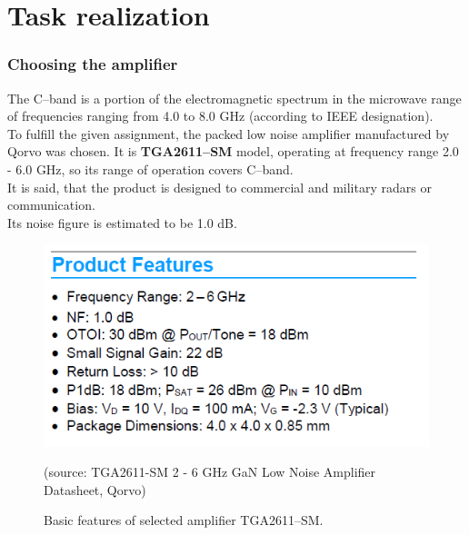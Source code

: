 \documentclass[eng,printmode]{mgr}
\begin{document}
\section{Task realization}
\subsubsection{Choosing the amplifier}
The C--band is a portion of the electromagnetic spectrum in the microwave range of frequencies ranging from 4.0 to 8.0 GHz (according to IEEE designation).\\
To fulfill the given assignment, the packed low noise amplifier manufactured by Qorvo was chosen. It is \textbf{TGA2611--SM} model, operating at frequency range 2.0 - 6.0 GHz, so its range of operation covers C--band.
\\
It is said, that the product is designed to commercial and military radars or communication.\\
Its noise figure is estimated to be 1.0 dB.

\begin{figure}[h]
	\centering
	\includegraphics[width=0.5\linewidth]{chip}
	\caption{Basic features of selected amplifier TGA2611--SM.}
	(source: TGA2611-SM 2 - 6 GHz GaN Low Noise Amplifier Datasheet, Qorvo)
	\label{fig:chip}
\end{figure}
\end{document}
